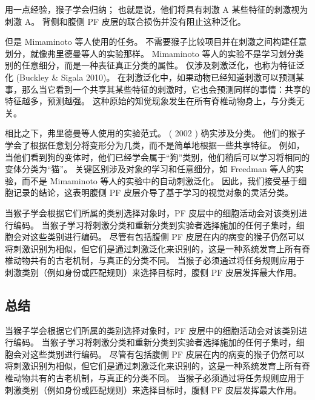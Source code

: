 用一点经验，猴子学会归纳； 也就是说，他们将具有刺激 A 某些特征的刺激视为刺激 A。
背侧和腹侧 PF 皮层的联合损伤并没有阻止这种泛化。
\par
但是 Mimaminoto 等人使用的任务。 
不需要猴子比较项目并在刺激之间构建任意划分，就像弗里德曼等人的实验那样。
Mimaminoto 等人的实验不是学习划分类别的任意细分，而是一种表征真正分类的属性。 
仅涉及刺激泛化，也称为特征泛化 (Buckley \& Sigala 2010)。 
在刺激泛化中，如果动物已经知道刺激可以预测某事，那么当它看到一个共享其某些特征的刺激时，它也会预测同样的事情：共享的特征越多，预测越强。
这种原始的知觉现象发生在所有脊椎动物身上，与分类无关。
\par
相比之下，弗里德曼等人使用的实验范式。 ( 2002 ) 确实涉及分类。 
他们的猴子学会了根据任意划分将变形分为几类，而不是简单地根据一些共享特征。 
例如，当他们看到狗的变体时，他们已经学会属于“狗”类别，他们稍后可以学习将相同的变体分类为“猫”。 
关键区别涉及对象的学习和任意细分，如 Freedman 等人的实验，而不是 Mimaminoto 等人的实验中的自动刺激泛化。 
因此，我们接受基于细胞记录的结论，这表明腹侧 PF 皮层介导了基于学习的视觉对象的灵活分类。
\par
当猴子学会根据它们所属的类别选择对象时，PF 皮层中的细胞活动会对该类别进行编码。 
当猴子学习将刺激分类和重新分类到实验者选择施加的任何子集时，细胞会对这些类别进行编码。 
尽管有包括腹侧 PF 皮层在内的病变的猴子仍然可以将刺激识别为相似，但它们是通过刺激泛化来识别的，这是一种系统发育上所有脊椎动物共有的古老机制，与真正的分类不同。 
当猴子必须通过将任务规则应用于刺激类别（例如身份或匹配规则）来选择目标时，腹侧 PF 皮层发挥最大作用。
\subsection{总结}
\par
当猴子学会根据它们所属的类别选择对象时，PF 皮层中的细胞活动会对该类别进行编码。 
当猴子学习将刺激分类和重新分类到实验者选择施加的任何子集时，细胞会对这些类别进行编码。 
尽管有包括腹侧 PF 皮层在内的病变的猴子仍然可以将刺激识别为相似，但它们是通过刺激泛化来识别的，这是一种系统发育上所有脊椎动物共有的古老机制，与真正的分类不同。 
当猴子必须通过将任务规则应用于刺激类别（例如身份或匹配规则）来选择目标时，腹侧 PF 皮层发挥最大作用。
